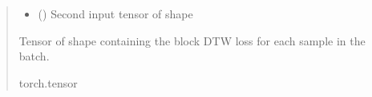 \documentclass[letterpaper,10pt,english]{sphinxmanual}
\begin{document}
\begin{fulllineitems}
\begin{fulllineitems}
\begin{quote}
\begin{description}
\begin{itemize}
\item {} 
\sphinxAtStartPar
{} () \textendash{} Second input tensor of shape 

\end{itemize}

\sphinxAtStartPar
{} \textendash{} Tensor of shape  containing the block DTW loss for each sample in the batch.

\sphinxAtStartPar
torch.tensor

\end{description}\end{quote}

\end{fulllineitems}


\end{fulllineitems}

\end{document}
